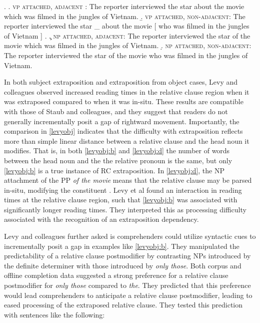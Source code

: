 \documentclass[12pt]{article}
\begin{document}
				\ex.	\label{levyobj}
					\a.	 \textsc{vp attached, adjacent }: The reporter interviewed the star about the movie which was filmed in the jungles of Vietnam.
					\b.	 \label{levyobj:b} \textsc{vp attached, non-adjacent}: The reporter interviewed the star \_ about the movie [ who was filmed in the jungles of Vietnam ] .
					\c.	 \textsc{np attached, adjacent}: The reporter interviewed the star of the movie which was filmed in the jungles of Vietnam.
					\d.	  \label{levyobj:d} \textsc{np attached, non-adjacent}: The reporter interviewed the star of the movie who was filmed in the jungles of Vietnam.
	
	In both subject extraposition and extraposition from object cases, Levy and colleagues observed increased reading times in the relative clause region when it was extraposed compared to when it was in-situ. These results are compatible with those of Staub and colleagues, and they suggest that readers do not generally incrementally posit a gap of rightward movement. Importantly, the comparison in \ref{levyobj} indicates that the difficulty with extraposition reflects more than simple linear distance between a relative clause and the head noun it modifies. That is, in both \ref{levyobj:b} and \ref{levyobj:d} the number of words between the head noun  and the the relative pronoun is the same, but only \ref{levyobj:b} is a true instance of RC extraposition. In \ref{levyobj:d}, the NP attachment of the PP \textit{of the movie} means that the relative clause may be parsed in-situ, modifying the constituent . Levy et al found an interaction in reading times at the relative clause region, such that \ref{levyobj:b} was associated with significantly longer reading times. They interpreted this as processing difficulty associated with the recognition of an extraposition dependency.

	Levy and colleagues further asked is comprehenders could utilize syntactic cues to incrementally posit a gap in examples like \ref{levyobj:b}. They manipulated the predictability of a relative clause postmodifier by contrasting NPs introduced by the definite determiner with those introduced by \textit{only those}. Both corpus and offline completion data suggested a strong preference for a relative clause postmodifier for \textit{only those} compared to \textit{the}. They predicted that this preference would lead comprehenders to anticipate a relative clause postmodifier, leading to eased processing of the extraposed relative clause. They tested this prediction with sentences like the following:
	
\end{document}
